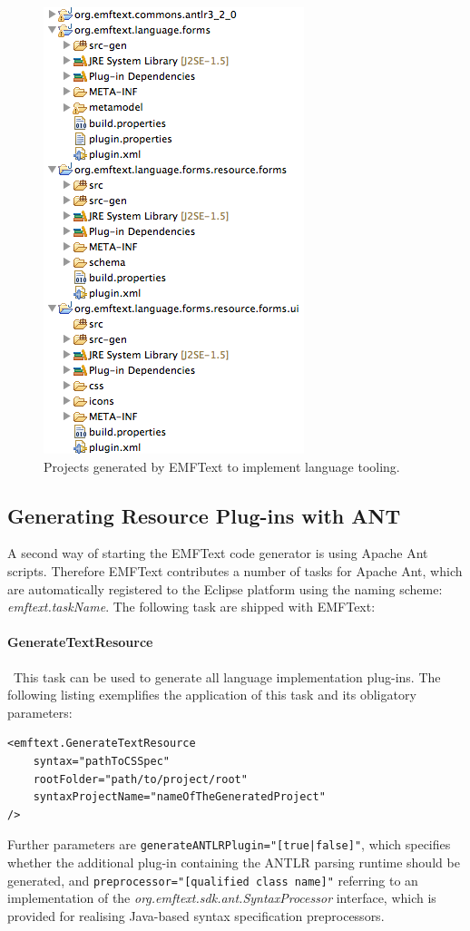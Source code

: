 	\begin{figure}[ht]
	\centering
		\includegraphics[scale=0.7]{figures/generationResults}
	\caption{Projects generated by EMFText to implement language tooling.}
	\label{fig:generationResults}
	\end{figure}

	\subsection{Generating Resource Plug-ins with ANT}
	\label{sec:process_generating_ant}
	A second way of starting the EMFText code generator is using Apache Ant
	scripts. Therefore EMFText contributes a number of tasks for Apache Ant,
	which are automatically registered to the Eclipse platform using the
	naming scheme: \emph{emftext.taskName}. The following task are shipped with
	EMFText:
	
	\paragraph*{GenerateTextResource}~This task can be used to generate all
	language implementation plug-ins. The following listing exemplifies the
	application of this task and its obligatory parameters:
\begin{lstlisting}
<emftext.GenerateTextResource
	syntax="pathToCSSpec"
	rootFolder="path/to/project/root"
	syntaxProjectName="nameOfTheGeneratedProject"
/>
\end{lstlisting}
	Further parameters are \texttt{generateANTLRPlugin="[true|false]"}, which
	specifies whether the additional plug-in
	containing the ANTLR parsing runtime should be generated, and
	\texttt{pre\-processor="[qualified class name]"} referring to an implementation
	of the \emph{org.emftext.sdk.\-ant.Syntax\-Processor} interface, which is provided
	for realising Java-based syntax specification preprocessors. 
	
